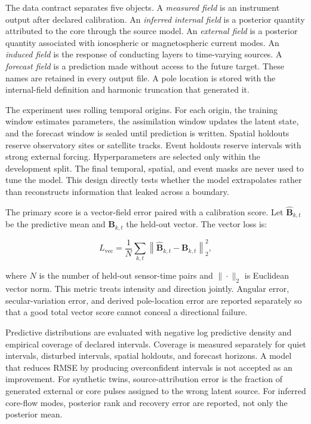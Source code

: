 \documentclass[conference]{IEEEtran}
\begin{document}
The data contract separates five objects. A \textit{measured field} is an instrument output after declared calibration. An \textit{inferred internal field} is a posterior quantity attributed to the core through the source model. An \textit{external field} is a posterior quantity associated with ionospheric or magnetospheric current modes. An \textit{induced field} is the response of conducting layers to time-varying sources. A \textit{forecast field} is a prediction made without access to the future target. These names are retained in every output file. A pole location is stored with the internal-field definition and harmonic truncation that generated it.

The experiment uses rolling temporal origins. For each origin, the training window estimates parameters, the assimilation window updates the latent state, and the forecast window is sealed until prediction is written. Spatial holdouts reserve observatory sites or satellite tracks. Event holdouts reserve intervals with strong external forcing. Hyperparameters are selected only within the development split. The final temporal, spatial, and event masks are never used to tune the model. This design directly tests whether the model extrapolates rather than reconstructs information that leaked across a boundary.

The primary score is a vector-field error paired with a calibration score. Let $\widehat{\mathbf{B}}_{k,t}$ be the predictive mean and $\mathbf{B}_{k,t}$ the held-out vector. The vector loss is:

\begin{equation}
L_{\mathrm{vec}}=\frac{1}{N}\sum_{k,t}\left\|\widehat{\mathbf{B}}_{k,t}-\mathbf{B}_{k,t}\right\|_2^2,
\label{eq:vectorloss}
\end{equation}

where $N$ is the number of held-out sensor-time pairs and $\|\cdot\|_2$ is Euclidean vector norm. This metric treats intensity and direction jointly. Angular error, secular-variation error, and derived pole-location error are reported separately so that a good total vector score cannot conceal a directional failure.

Predictive distributions are evaluated with negative log predictive density and empirical coverage of declared intervals. Coverage is measured separately for quiet intervals, disturbed intervals, spatial holdouts, and forecast horizons. A model that reduces RMSE by producing overconfident intervals is not accepted as an improvement. For synthetic twins, source-attribution error is the fraction of generated external or core pulses assigned to the wrong latent source. For inferred core-flow modes, posterior rank and recovery error are reported, not only the posterior mean.
\end{document}
